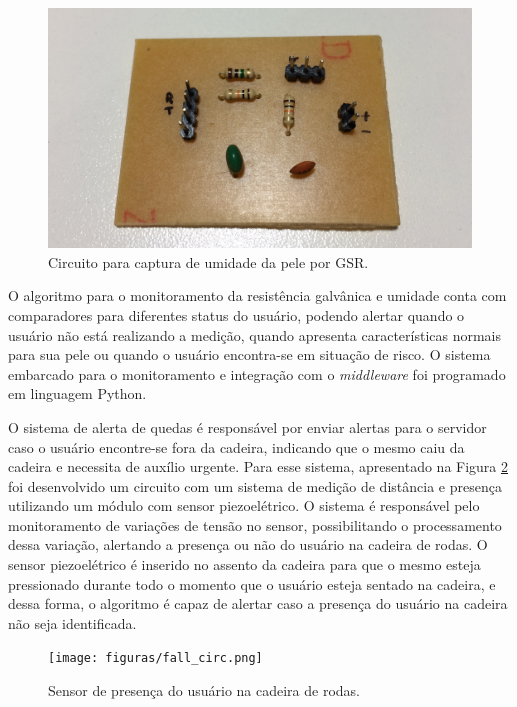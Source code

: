 \begin{figure}
    \begin{center}
        \includegraphics[scale=0.1]{figuras/gsr_circ.jpg}
    \end{center}
    \caption{Circuito para captura de umidade da pele por GSR.}
    \label{fig:gsr_circ}
\end{figure}

O algoritmo para o monitoramento da resistência galvânica e umidade conta com
comparadores para diferentes status do usuário, podendo alertar quando o usuário
não está realizando a medição, quando apresenta características normais para sua
pele ou quando o usuário encontra-se em situação de risco. O sistema embarcado para
o monitoramento e integração com o \textit{middleware} foi programado em linguagem Python.

O sistema de alerta de quedas é responsável por enviar alertas para o servidor
caso o usuário encontre-se fora da cadeira, indicando que o mesmo caiu da cadeira
e necessita de auxílio urgente. Para esse sistema, apresentado na Figura \ref{fig:fall_ele} foi desenvolvido um circuito
com um sistema de medição de distância e presença utilizando um módulo com sensor
piezoelétrico. O sistema é responsável pelo monitoramento de variações de tensão
no sensor, possibilitando o processamento dessa variação, alertando a presença
ou não do usuário na cadeira de rodas. O sensor piezoelétrico é inserido no assento
da cadeira para que o mesmo esteja pressionado durante todo o momento que o usuário
esteja sentado na cadeira, e dessa forma, o algoritmo é capaz de alertar caso a
presença do usuário na cadeira não seja identificada.

\begin{figure}
    \begin{center}
        \texttt{[image: figuras/fall\_circ.png]}
    \end{center}
    \caption{Sensor de presença do usuário na cadeira de rodas.}
    \label{fig:fall_ele}
\end{figure}


